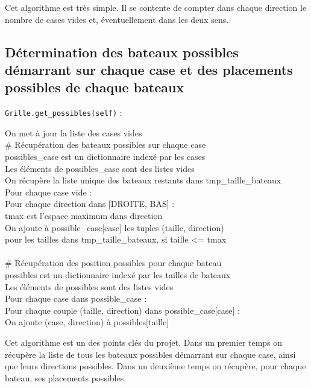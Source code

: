 Cet algorithme est très simple. Il se contente de compter dans chaque direction le nombre de cases vides et, éventuellement dans les deux sens.

\newpage

\subsection{Détermination des bateaux possibles démarrant sur chaque case et des placements possibles de chaque bateaux}\label{get_possibles}
\texttt{Grille.get\_possibles(self)} :
\begin{algo1}
On met à jour la liste des cases vides\\
\# Récupération des bateaux possibles sur chaque case\\
possibles\_case est un dictionnaire indexé par les cases\\
Les éléments de possibles\_case sont des listes vides\\
On récupère la liste unique des bateaux restants dans tmp\_taille\_bateaux\\
Pour chaque case vide :\\
Pour chaque direction dans [DROITE, BAS] :\\
tmax est l'espace maximum dans direction\\
On ajoute à possible\_case[case] les tuples (taille, direction)\\
pour les tailles dans tmp\_taille\_bateaux, si taille <= tmax\\
\ \\
\# Récupération des position possibles pour chaque bateau\\
possibles est un dictionnaire indexé par les tailles de bateaux\\
Les éléments de possibles sont des listes vides\\
Pour chaque case dans possible\_case :\\
Pour chaque couple (taille, direction) dans possible\_case[case] :\\
On ajoute (case, direction) à possibles[taille]\\ 
\end{algo1}

Cet algorithme est un des points clés du projet. Dans un premier temps on récupère la liste de tous les bateaux possibles démarrant sur chaque case, ainsi que leurs directions possibles. Dans un deuxième temps on récupère, pour chaque bateau, ses placements possibles. 

